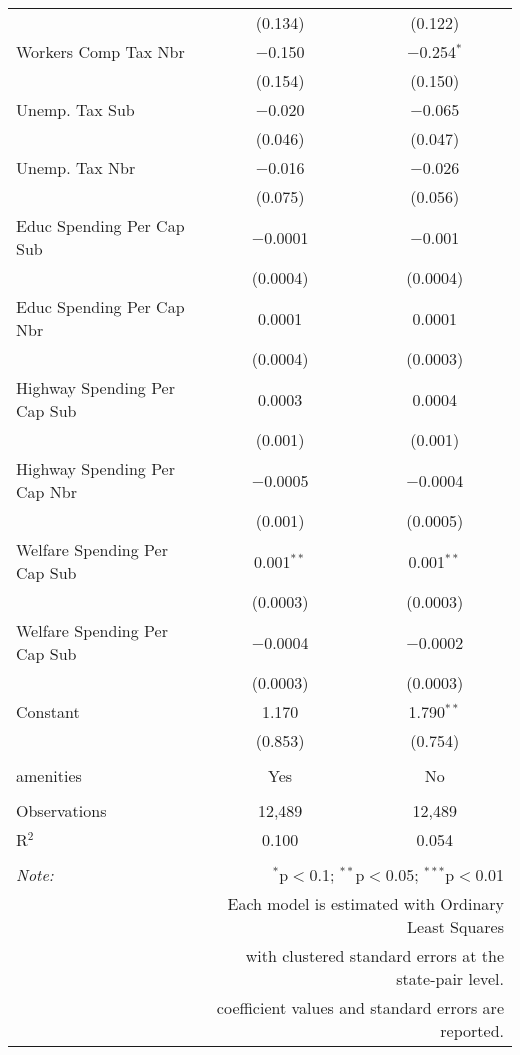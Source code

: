 \begin{table}[!htbp]
\begin{tabular}{@{\extracolsep{5pt}}lcc}
  & (0.134) & (0.122) \\ 
  Workers Comp Tax Nbr & $-$0.150 & $-$0.254$^{*}$ \\ 
  & (0.154) & (0.150) \\ 
  Unemp. Tax Sub & $-$0.020 & $-$0.065 \\ 
  & (0.046) & (0.047) \\ 
  Unemp. Tax Nbr & $-$0.016 & $-$0.026 \\ 
  & (0.075) & (0.056) \\ 
  Educ Spending Per Cap Sub & $-$0.0001 & $-$0.001 \\ 
  & (0.0004) & (0.0004) \\ 
  Educ Spending Per Cap Nbr & 0.0001 & 0.0001 \\ 
  & (0.0004) & (0.0003) \\ 
  Highway Spending Per Cap Sub & 0.0003 & 0.0004 \\ 
  & (0.001) & (0.001) \\ 
  Highway Spending Per Cap Nbr & $-$0.0005 & $-$0.0004 \\ 
  & (0.001) & (0.0005) \\ 
  Welfare Spending Per Cap Sub & 0.001$^{**}$ & 0.001$^{**}$ \\ 
  & (0.0003) & (0.0003) \\ 
  Welfare Spending Per Cap Sub & $-$0.0004 & $-$0.0002 \\ 
  & (0.0003) & (0.0003) \\ 
  Constant & 1.170 & 1.790$^{**}$ \\ 
  & (0.853) & (0.754) \\ 
 \hline \\[-1.8ex] 
amenities & Yes & No \\ 
\hline \\[-1.8ex] 
Observations & 12,489 & 12,489 \\ 
R$^{2}$ & 0.100 & 0.054 \\ 
\hline 
\hline \\[-1.8ex] 
\textit{Note:}  & \multicolumn{2}{r}{$^{*}$p$<$0.1; $^{**}$p$<$0.05; $^{***}$p$<$0.01} \\ 
 & \multicolumn{2}{r}{Each model is estimated with Ordinary Least Squares} \\ 
 & \multicolumn{2}{r}{with clustered standard errors at the state-pair level.} \\ 
 & \multicolumn{2}{r}{coefficient values and standard errors are reported.} \\ 
\end{tabular} 
\end{table} 
